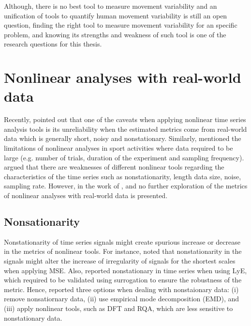Although, there is no best tool to measure movement variability and an 
unification of tools to quantify human movement variability is still an 
open question, finding the right tool to measure movement variability 
for an specific problem, and knowing its strengths and weakness of such 
tool is one of the research questions for this thesis. 


\section{Nonlinear analyses with real-world data} \label{nonlieaRealdata} 
Recently, \cite{huffaker2017} pointed out that one of the caveats 
when applying nonlinear time series analysis tools is its unreliability 
when the estimated metrics come from real-world data which is generally 
short, noisy and nonstationary. Similarly, \cite{preatoni2013} mentioned 
the limitations of nonlinear analyses in sport activities 
where data required to be large (e.g. number of trials, duration of the 
experiment and sampling frequency). \cite{caballero2014}
argued that there are weaknesses of different 
nonlinear tools regarding the characteristics of the time series such 
as nonstationarity, length data size, noise, sampling rate.
However, in the work of \cite{huffaker2017}, \cite{preatoni2013} and
\cite{caballero2014} no further exploration of the metrics of nonlinear
analyses with real-world data is presented.



%


\subsection{Nonsationarity}
Nonstationarity of time series signals might create
spurious increase or decrease in the metrics of nonlinear tools. 
For instance, \cite{costa2007} noted that nonstationarity in the signals might 
alter the increase of irregularity of signals for the shortest scales when 
applying MSE.  Also, \cite{dingwell2000} reported nonstationary in time series 
when using LyE, which required to be validated using surrogation 
to ensure the robustness of the metric. 
Hence, \cite{caballero2014} reported three options when dealing with 
nonstaionary data: (i) remove nonsatiornary data, (ii) use empirical mode 
decomposition (EMD), and (iii) apply nonlinear tools, such as DFT and RQA, 
which are less sensitive to nonstationary data.

